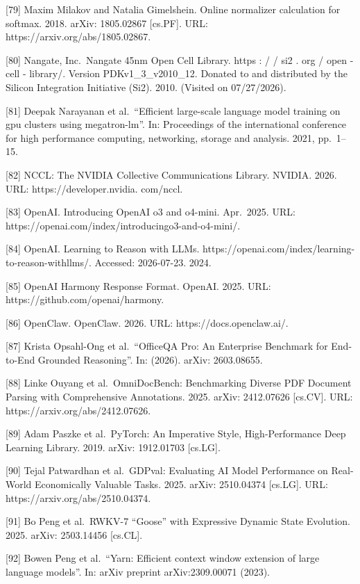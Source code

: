 \documentclass[
  10
]{article}
\begin{document}
{[}79{]} Maxim Milakov and Natalia Gimelshein. Online normalizer
calculation for softmax. 2018. arXiv: 1805.02867 {[}cs.PF{]}. URL:
https://arxiv.org/abs/1805.02867.

{[}80{]} Nangate, Inc.~Nangate 45nm Open Cell Library. https : / / si2 .
org / open - cell - library/. Version PDKv1\_3\_v2010\_12. Donated to
and distributed by the Silicon Integration Initiative (Si2). 2010.
(Visited on 07/27/2026).

{[}81{]} Deepak Narayanan et al.~``Efficient large-scale language model
training on gpu clusters using megatron-lm''. In: Proceedings of the
international conference for high performance computing, networking,
storage and analysis. 2021, pp.~1--15.

{[}82{]} NCCL: The NVIDIA Collective Communications Library. NVIDIA.
2026. URL: https://developer.nvidia. com/nccl.

{[}83{]} OpenAI. Introducing OpenAI o3 and o4-mini. Apr.~2025. URL:
https://openai.com/index/introducingo3-and-o4-mini/.

{[}84{]} OpenAI. Learning to Reason with LLMs.
https://openai.com/index/learning-to-reason-withllms/. Accessed:
2026-07-23. 2024.

{[}85{]} OpenAI Harmony Response Format. OpenAI. 2025. URL:
https://github.com/openai/harmony.

{[}86{]} OpenClaw. OpenClaw. 2026. URL: https://docs.openclaw.ai/.

{[}87{]} Krista Opsahl-Ong et al.~``OfficeQA Pro: An Enterprise
Benchmark for End-to-End Grounded Reasoning''. In: (2026). arXiv:
2603.08655.

{[}88{]} Linke Ouyang et al.~OmniDocBench: Benchmarking Diverse PDF
Document Parsing with Comprehensive Annotations. 2025. arXiv: 2412.07626
{[}cs.CV{]}. URL: https://arxiv.org/abs/2412.07626.

{[}89{]} Adam Paszke et al.~PyTorch: An Imperative Style,
High-Performance Deep Learning Library. 2019. arXiv: 1912.01703
{[}cs.LG{]}.

{[}90{]} Tejal Patwardhan et al.~GDPval: Evaluating AI Model Performance
on Real-World Economically Valuable Tasks. 2025. arXiv: 2510.04374
{[}cs.LG{]}. URL: https://arxiv.org/abs/2510.04374.

{[}91{]} Bo Peng et al.~RWKV-7 ``Goose'' with Expressive Dynamic State
Evolution. 2025. arXiv: 2503.14456 {[}cs.CL{]}.

{[}92{]} Bowen Peng et al.~``Yarn: Efficient context window extension of
large language models''. In: arXiv preprint arXiv:2309.00071 (2023).
\end{document}
